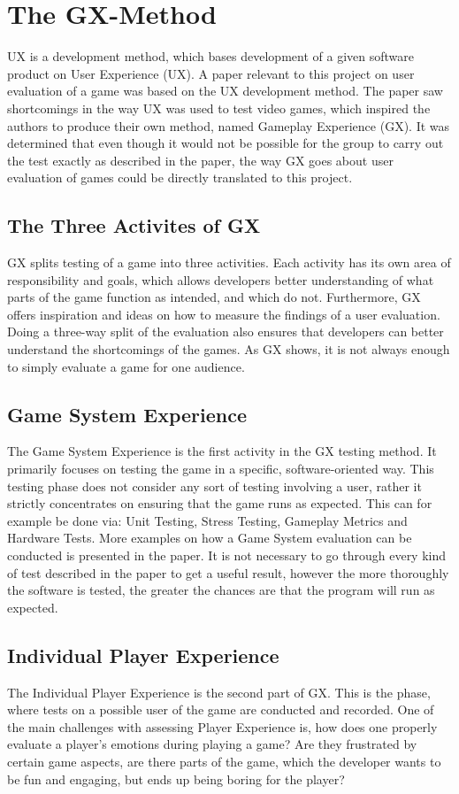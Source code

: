 \section{The GX-Method}
\label{sec:gx_ux_method}
UX is a development method, which bases development of a given software product on User Experience (UX).
A paper relevant to this project on user evaluation of a game was based on the UX development method.
The paper saw shortcomings in the way UX was used to test video games, which inspired the authors to produce their own method, named Gameplay Experience (GX).
It was determined that even though it would not be possible for the group to carry out the test exactly as described in the paper, the way GX goes about user evaluation of games could be directly translated to this project.\cite{gxmethod}

\subsection{The Three Activites of GX}
GX splits testing of a game into three activities.
Each activity has its own area of responsibility and goals, which allows developers better understanding of what parts of the game function as intended, and which do not.
Furthermore, GX offers inspiration and ideas on how to measure the findings of a user evaluation.
Doing a three-way split of the evaluation also ensures that developers can better understand the shortcomings of the games.
As GX shows, it is not always enough to simply evaluate a game for one audience.

\subsection{Game System Experience}
The Game System Experience is the first activity in the GX testing method.
It primarily focuses on testing the game in a specific, software-oriented way.
This testing phase does not consider any sort of testing involving a user, rather it strictly concentrates on ensuring that the game runs as expected.
This can for example be done via: Unit Testing, Stress Testing, Gameplay Metrics and Hardware Tests.
More examples on how a Game System evaluation can be conducted is presented in the paper.\cite{gxmethod}
It is not necessary to go through every kind of test described in the paper to get a useful result, however the more thoroughly the software is tested, the greater the chances are that the program will run as expected.

\subsection{Individual Player Experience}
The Individual Player Experience is the second part of GX.
This is the phase, where tests on a possible user of the game are conducted and recorded.
One of the main challenges with assessing Player Experience is, how does one properly evaluate a player's emotions during playing a game?
Are they frustrated by certain game aspects, are there parts of the game, which the developer wants to be fun and engaging, but ends up being boring for the player?

